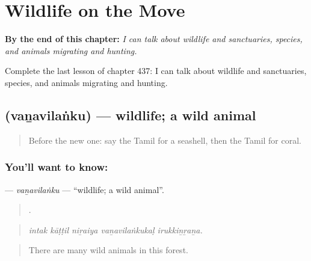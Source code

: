 
\chapter{Wildlife on the Move}
\label{ch:ta-wildlife-on-the-move}

\begin{chapteropening}
\textbf{By the end of this chapter:} \emph{I can talk about wildlife and sanctuaries, species, and animals migrating and hunting.}

Complete the last lesson of chapter 437: I can talk about wildlife and sanctuaries, species, and animals migrating and hunting.
\end{chapteropening}

\section[\texorpdfstring{\ta{வனவிலங்கு} (vaṉavilaṅku)}{வனவிலங்கு (vaṉavilaṅku)}]{ (vaṉavilaṅku) — wildlife; a wild animal}

\label{lesson:TA-C437-vanavilanku}



\begin{quote}
Before the new one: say the Tamil for a seashell, then the Tamil for coral.
\end{quote}

\subsection*{You'll want to know: }
\textbf{} — \emph{vaṉavilaṅku} — \textquotedblleft{}wildlife; a wild animal\textquotedblright{}.

\begin{quote}
    .
\end{quote}

\begin{quote}
\emph{intak kāṭṭil niṟaiya vaṉavilaṅkukaḷ irukkiṉṟaṉa.}
\end{quote}

\begin{quote}
There are many wild animals in this forest.
\end{quote}

